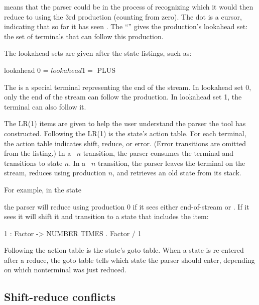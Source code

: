 \documentclass[10pt]{article}
\begin{document}
\begin{strictcode}
\begin{strictcode}
\begin{strictcode}
\begin{strictcode}
\begin{strictcode}
\begin{strictcode}
\begin{strictcode}
\begin{strictcode}
\begin{strictcode}
\begin{strictcode}
\begin{strictcode}
\noindent
means that the parser could be in the process of recognizing
 which it would then reduce to  using
the 3rd production (counting from zero).  The dot is a cursor,
indicating that so far it has seen
.  The ``'' gives the production's lookahead
set: the set of terminals that can follow this production.

The lookahead sets are given after the state listings, such as:

\begin{code}
lookahead 0 = $ 
lookahead 1 = $ PLUS 
\end{code}

The \cd{$} is a special terminal representing the end of the stream.
In lookahead set 0, only the end of the stream can follow the
production.  In lookahead set 1, the  terminal can also
follow it.

The LR(1) items are given to help the user understand the parser the
tool has constructed.  Following the LR(1) is the state's action table.
For each terminal, the action table indicates shift, reduce, or error.
(Error transitions are omitted from the listing.)  In a ~$n$
transition, the parser consumes the terminal and transitions to state
$n$.  In a ~$n$ transition, the parser leaves the terminal on the
stream, reduces using production $n$, and retrieves an old state from
its stack.

For example, in the state


\noindent
the parser will reduce using production 0 if it sees either
end-of-stream or .  If it sees  it will shift it
and transition to a state that includes the item:

\begin{code}
1 : Factor -> NUMBER TIMES . Factor  / 1
\end{code}

Following the action table is the state's goto table.  When a state is
re-entered after a reduce, the goto table tells which state the parser
should enter, depending on which nonterminal was just reduced.


\subsection{Shift-reduce conflicts}


\end{strictcode}
\end{strictcode}
\end{strictcode}
\end{strictcode}
\end{strictcode}
\end{strictcode}
\end{strictcode}
\end{strictcode}
\end{strictcode}
\end{strictcode}
\end{strictcode}
\end{document}
